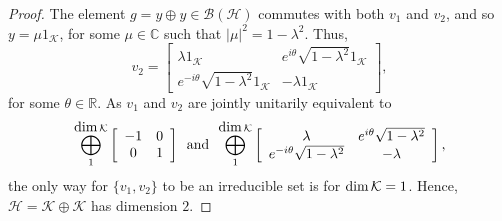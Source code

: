 \documentclass[10pt,a4paper]{amsart}
\newcommand{\B}{\mathcal{B}}
\newcommand{\K}{\mathcal K}
\renewcommand{\H}{\mathcal{H}}
\begin{document}
\begin{proof}
	The element $g=y\oplus y\in\B(\H)$ commutes with both $v_1$ and $v_2$,
	and so $y=\mu 1_\K$, for some $\mu\in\mathbb C$ such that $|\mu|^2=1-\lambda^2$. 
	Thus,
	\[
	v_2=\left[\begin{array}{cc} \lambda 1_\K & e^{i\theta}\sqrt{1-\lambda^2} 1_\K \\ e^{-i\theta}\sqrt{1-\lambda^2}1_\K & -\lambda 1_\K\end{array}\right],
	\]
	for some $\theta\in\mathbb R$.
As $v_1$ and $v_2$ are jointly unitarily equivalent to
	\[
	\bigoplus_1^{\mbox{\textrm dim}\,\K}\left[ \begin{array}{cc}-1 &0 \\ 0 & 1\end{array}\right]
	\,\mbox{ and }\,
	\bigoplus_1^{\mbox{\textrm dim}\,\K}
	\left[ \begin{array}{cc}\lambda &e^{i\theta}\sqrt{1-\lambda^2} \\ e^{-i\theta}\sqrt{1-\lambda^2} & -\lambda\end{array}\right],
	\]
	the only way for $\{v_1,v_2\}$ to be an irreducible set is for $\mbox{\textrm dim}\,\K=1$.
	Hence, $\H=\K\oplus\K$ has dimension $2$.
\end{proof}
\end{document}
